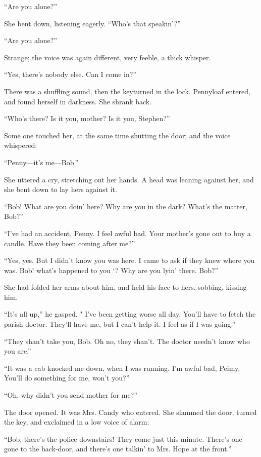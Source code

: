 ``Are you alone?''

She bent down, listening eagerly. ``Who's that speakin'?''

``Are you alone?''

Strange; the voice was again different, very feeble, a thick whisper.

{\protect\hypertarget{213}{}{}}``Yes, there's nobody else. Can I come
in?''

There was a shuffling sound, then the keyturned in the lock. Pennyloaf
entered, and found herself in darkness. She shrank back.

``Who's there? Is it you, mother? Is it you, Stephen?''

Some one touched her, at the same time shutting the door; and the voice
whispered:

``Penny---it's me---Bob.''

She uttered a cry, stretching out her hands. A head was leaning against
her, and she bent down to lay hers against it.

``Bob! What are you doin' here? Why are you in the dark? What's the
matter, Bob?''

``I've had an accident, Penny. I feel awful bad. Your mother's gone out
to buy a candle. Have they been coming after me?''

``Yes, yes. But I didn't know you was here. I came to ask if they knew
where you was. Bob! what's happened to you `? Why are you lyin' there.
Bob?''

She had folded her arms about him, and held his face to hers, sobbing,
kissing him.

``It's all up,'' he gasped. " I've been getting worse all day. You'll
have to fetch the parish {\protect\hypertarget{214}{}{}}doctor. They'll
have me, but I can't help it. I feel as if I was going.''

``They shan't take you, Bob. Oh no, they shan't. The doctor needn't know
who you are.''

``It was a cab knocked me down, when I was running. I'm awful bad,
Peimy. You'll do something for me, won't you?''

``Oh, why didn't you send mother for me?''

The door opened. It was Mrs. Candy who entered. She slammed the door,
turned the key, and exclaimed in a low voice of alarm:

``Bob, there's the police downstairs! They come just this minute.
There's one gone to the back-door, and there's one talkin' to Mrs. Hope
at the front.''

